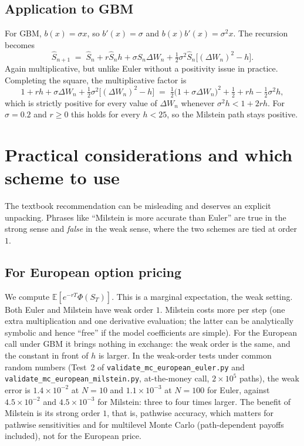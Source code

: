 \documentclass[11pt,a4paper]{article}
\theoremstyle{plain}
\theoremstyle{definition}
\theoremstyle{remark}
\newcommand{\E}{\mathbb{E}}
\begin{document}
\subsection{Application to GBM}

For GBM, $b(x) = \sigma x$, so $b'(x) = \sigma$ and
$b(x) b'(x) = \sigma^2 x$. The recursion becomes
\begin{equation}
\label{eq:milstein-gbm}
\hat S_{n+1} \;=\; \hat S_n + r \hat S_n h + \sigma \hat S_n \Delta W_n
+ \tfrac{1}{2} \sigma^2 \hat S_n \big[(\Delta W_n)^2 - h\big].
\end{equation}
Again multiplicative, but unlike Euler without a positivity issue in
practice. Completing the square, the multiplicative factor is
\[
1 + r h + \sigma \Delta W_n + \tfrac{1}{2} \sigma^2 \big[(\Delta W_n)^2 - h\big]
\;=\; \tfrac{1}{2} \big(1 + \sigma \Delta W_n\big)^2
+ \tfrac{1}{2} + r h - \tfrac{1}{2} \sigma^2 h,
\]
which is strictly positive for every value of $\Delta W_n$ whenever
$\sigma^2 h < 1 + 2 r h$. For $\sigma = 0.2$ and $r \geq 0$ this holds
for every $h < 25$, so the Milstein path stays positive.

\section{Practical considerations and which scheme to use}
\label{sec:practical}

The textbook recommendation can be misleading and deserves an
explicit unpacking. Phrases like ``Milstein is more accurate than
Euler'' are true in the strong sense and \emph{false} in the weak
sense, where the two schemes are tied at order $1$.

\subsection{For European option pricing}

We compute $\E[e^{-rT} \Phi(S_T)]$. This is a marginal expectation,
the weak setting. Both Euler and Milstein have weak order $1$.
Milstein costs more per step (one extra multiplication and one
derivative evaluation; the latter can be analytically symbolic and
hence ``free'' if the model coefficients are simple). For the European
call under GBM it brings nothing in exchange: the weak order is the
same, and the constant in front of $h$ is larger. In the weak-order
tests under common random numbers (Test~2 of
\texttt{validate\_mc\_european\_euler.py} and
\texttt{validate\_mc\_european\_milstein.py}, at-the-money call,
$2 \times 10^5$ paths), the weak error is $1.4 \times 10^{-2}$ at
$N = 10$ and $1.1 \times 10^{-3}$ at $N = 100$ for Euler, against
$4.5 \times 10^{-2}$ and $4.5 \times 10^{-3}$ for Milstein: three to
four times larger. The benefit of Milstein is its strong order $1$,
that is, pathwise accuracy, which matters for pathwise sensitivities and
for multilevel Monte Carlo (path-dependent payoffs included), not for
the European price.
\end{document}
